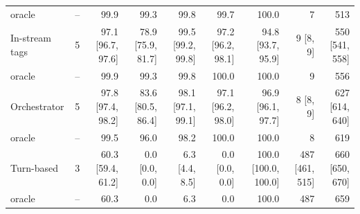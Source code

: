 \begin{tabular}{llrrrrrrr}
\quad oracle & -- & {\color{gray}99.9} & {\color{gray}99.3} & {\color{gray}99.8} & {\color{gray}99.7} & {\color{gray}100.0} & {\color{gray}7} & {\color{gray}513} \\
In-stream tags & 5 & 97.1 {\scriptsize[96.7, 97.6]} & 78.9 {\scriptsize[75.9, 81.7]} & 99.5 {\scriptsize[99.2, 99.8]} & 97.2 {\scriptsize[96.2, 98.1]} & 94.8 {\scriptsize[93.7, 95.9]} & 9 {\scriptsize[8, 9]} & 550 {\scriptsize[541, 558]} \\
\quad oracle & -- & {\color{gray}99.9} & {\color{gray}99.3} & {\color{gray}99.8} & {\color{gray}100.0} & {\color{gray}100.0} & {\color{gray}9} & {\color{gray}556} \\
Orchestrator & 5 & 97.8 {\scriptsize[97.4, 98.2]} & 83.6 {\scriptsize[80.5, 86.4]} & 98.1 {\scriptsize[97.1, 99.1]} & 97.1 {\scriptsize[96.2, 98.0]} & 96.9 {\scriptsize[96.1, 97.7]} & 8 {\scriptsize[8, 9]} & 627 {\scriptsize[614, 640]} \\
\quad oracle & -- & {\color{gray}99.5} & {\color{gray}96.0} & {\color{gray}98.2} & {\color{gray}100.0} & {\color{gray}100.0} & {\color{gray}8} & {\color{gray}619} \\
Turn-based & 3 & 60.3 {\scriptsize[59.4, 61.2]} & 0.0 {\scriptsize[0.0, 0.0]} & 6.3 {\scriptsize[4.4, 8.5]} & 0.0 {\scriptsize[0.0, 0.0]} & 100.0 {\scriptsize[100.0, 100.0]} & 487 {\scriptsize[461, 515]} & 660 {\scriptsize[650, 670]} \\
\quad oracle & -- & {\color{gray}60.3} & {\color{gray}0.0} & {\color{gray}6.3} & {\color{gray}0.0} & {\color{gray}100.0} & {\color{gray}487} & {\color{gray}659} \\
\bottomrule
\end{tabular}
